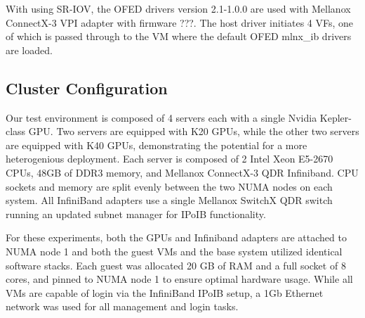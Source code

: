 \documentclass[times,10pt,twocolumn,conference]{IEEEtran}
\begin{document}
With using SR-IOV, the OFED drivers version 2.1-1.0.0 are used with Mellanox ConnectX-3 VPI adapter with firmware ???.  The host driver initiates 4 VFs, one of which is passed through to the VM where the default OFED mlnx\_ib drivers are loaded.  




\subsection{Cluster Configuration}

Our test environment is composed of 4 servers each with a single Nvidia Kepler-class GPU.  Two servers are equipped with K20 GPUs, while the other two servers are equipped with K40 GPUs, demonstrating the potential for a more heterogenious deployment.  Each server is composed of 2 Intel Xeon E5-2670 CPUs, 48GB of DDR3 memory, and Mellanox ConnectX-3 QDR Infiniband.  CPU sockets and memory are split evenly between the two NUMA nodes on each system. All InfiniBand adapters use a single Mellanox SwitchX QDR switch running an updated subnet manager for IPoIB functionality.   


For these experiments, both the GPUs and Infiniband adapters are attached to NUMA node 1 and both the guest VMs and the base system utilized identical software stacks.  Each guest was allocated 20 GB of RAM and a full socket of 8 cores, and pinned to NUMA node 1 to ensure optimal hardware usage. While all VMs are capable of login via the InfiniBand IPoIB setup, a 1Gb Ethernet network was used for all management and login tasks.  

\end{document}
